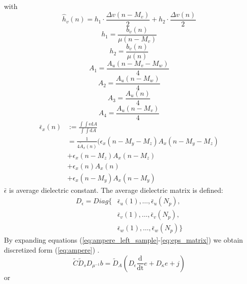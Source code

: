 with 
\begin{equation}
\widehat{h}_{v}(n)=h_{1}\cdot\frac{\Delta v(n-M_{v})}{2}+ h_{2}\cdot\frac{\Delta v(n)}{2}
\label{eq:megnetic_field1}
\end{equation}
\begin{equation}
h_{1}=\frac{b_{v}(n)}{\mu (n-M_{v})}
\label{eq:megnetic_field2}
\end{equation}
\begin{equation}
h_{2}=\frac{b_{v}(n)}{\mu (n)}
\label{eq:megnetic_field3}
\end{equation}
\begin{equation}
A_{1}=\frac{A_{u}(n-M_{v}-M_{w})}{4}
\end{equation}
\begin{equation}
A_{2}=\frac{A_{u}(n-M_{w})}{4}
\end{equation}
\begin{equation}
A_{3}=\frac{A_{u}(n)}{4}
\end{equation}
\begin{equation}
A_{4}=\frac{A_{u}(n-M_{v})}{4}
\end{equation}
\begin{align}
\bar{\epsilon}_{x}(n)&:=\frac{\int\int\epsilon\mathrm{d}A}{\int\int\mathrm{d}A}\nonumber\\
&=\frac{1}{4\tilde{A}_{x}(n)}(\epsilon_{x}(n-M_{y}-M_{z})A_{x}(n-M_{y}-M_{z})\nonumber\\
&+\epsilon_{x}(n-M_{z})A_{x}(n-M_{z}) \nonumber\\
&+\epsilon_{x}(n)A_{x}(n) \nonumber\\
&+\epsilon_{x}(n-M_{y})A_{x}(n-M_{y})
\end{align}
$\bar{\epsilon}$ is average dielectric constant. 
The average dielectric matrix is defined:
\begin{align}
D_{\epsilon}=
Diag\{&\bar{\epsilon}_{u}(1),\ldots,\bar{\epsilon}_{u}(N_{p}),\nonumber\\
&\bar{\epsilon}_{v}(1),\ldots,\bar{\epsilon}_{v}(N_{p}),\nonumber\\
&\bar{\epsilon}_{w}(1),\ldots,\bar{\epsilon}_{w}(N_{p})
\}
\label{eq:eps_matrix}
\end{align}
By expanding equations (\ref{eq:ampere_left_sample}-\ref{eq:eps_matrix}) we obtain discretized form (\ref{eq:ampere}) .
\begin{equation}
\tilde{C}\tilde{D}_{s}D_{\mu^{-1}}b=\tilde{D}_{A}(D_{\epsilon}\frac{\mathrm{d}}{\mathrm{dt}}e+D_{\kappa}e+j)
\label{eq:ampere}
\end{equation}
or

